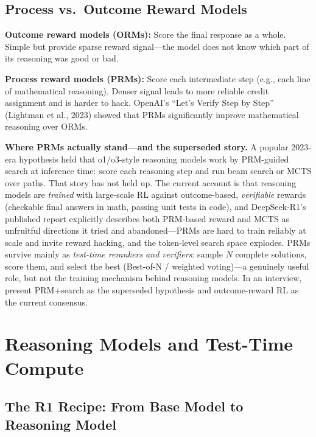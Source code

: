 \subsection{Process vs.\ Outcome Reward Models}

\textbf{Outcome reward models (ORMs):} Score the final response as a whole. Simple but provide sparse reward signal---the model does not know which part of its reasoning was good or bad.

\textbf{Process reward models (PRMs):} Score each intermediate step (e.g., each line of mathematical reasoning). Denser signal leads to more reliable credit assignment and is harder to hack. OpenAI's ``Let's Verify Step by Step'' (Lightman et al., 2023) showed that PRMs significantly improve mathematical reasoning over ORMs.

\textbf{Where PRMs actually stand---and the superseded story.} A popular 2023-era hypothesis held that o1/o3-style reasoning models work by PRM-guided search at inference time: score each reasoning step and run beam search or MCTS over paths. That story has not held up. The current account is that reasoning models are \textit{trained} with large-scale RL against outcome-based, \textit{verifiable} rewards (checkable final answers in math, passing unit tests in code), and DeepSeek-R1's published report explicitly describes both PRM-based reward and MCTS as unfruitful directions it tried and abandoned---PRMs are hard to train reliably at scale and invite reward hacking, and the token-level search space explodes. PRMs survive mainly as \textit{test-time rerankers and verifiers}: sample $N$ complete solutions, score them, and select the best (Best-of-N / weighted voting)---a genuinely useful role, but not the training mechanism behind reasoning models. In an interview, present PRM+search as the superseded hypothesis and outcome-reward RL as the current consensus.

\section{Reasoning Models and Test-Time Compute}
\label{sec:reasoning_ttc}

\subsection{The R1 Recipe: From Base Model to Reasoning Model}

